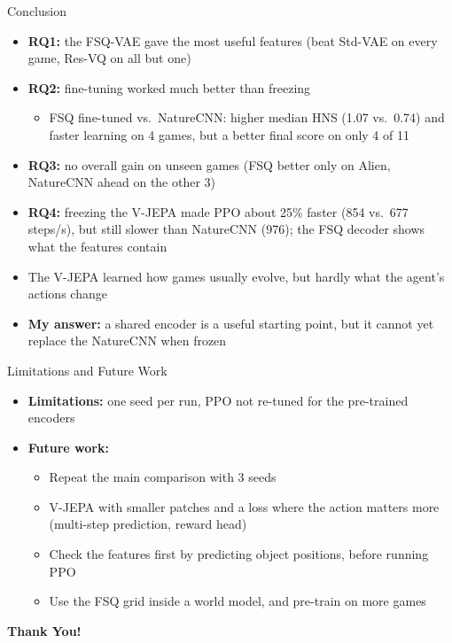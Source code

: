 \documentclass[aspectratio=43,10pt]{beamer}
\begin{document}
\begin{frame}{Conclusion}
  \begin{itemize}\setlength\itemsep{0.55em}
    \item \textbf{RQ1:} the FSQ-VAE gave the most useful features (beat Std-VAE on every game,
          Res-VQ on all but one)
    \item \textbf{RQ2:} fine-tuning worked much better than freezing
      \begin{itemize}
        \item FSQ fine-tuned vs.\ NatureCNN: higher median HNS (1.07 vs.\ 0.74) and faster
              learning on 4 games, but a better final score on only 4 of 11
      \end{itemize}
    \item \textbf{RQ3:} no overall gain on unseen games (FSQ better only on Alien, NatureCNN
          ahead on the other 3)
    \item \textbf{RQ4:} freezing the V-JEPA made PPO about 25\% faster (854 vs.\ 677 steps/s),
          but still slower than NatureCNN (976); the FSQ decoder shows what the features contain
    \item The V-JEPA learned how games usually evolve, but hardly what the agent's actions change
    \item \textbf{My answer:} a shared encoder is a useful starting point, but it cannot yet
          replace the NatureCNN when frozen
  \end{itemize}
\end{frame}

\begin{frame}{Limitations and Future Work}
  \begin{itemize}\setlength\itemsep{0.55em}
    \item \textbf{Limitations:} one seed per run, PPO not re-tuned for the pre-trained encoders
    \item \textbf{Future work:}
      \begin{itemize}\setlength\itemsep{0.3em}
        \item Repeat the main comparison with 3 seeds
        \item V-JEPA with smaller patches and a loss where the action matters more
              (multi-step prediction, reward head)
        \item Check the features first by predicting object positions, before running PPO
        \item Use the FSQ grid inside a world model, and pre-train on more games
      \end{itemize}
  \end{itemize}
\end{frame}

\begin{frame}
  \vfill
  \centering
  {\Huge\bfseries Thank You!}
  \vfill
\end{frame}
\end{document}
